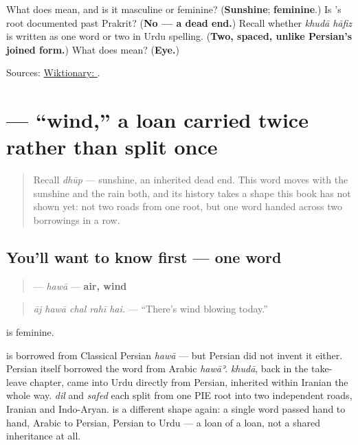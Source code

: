 \begin{tcolorbox}[breakable,colback=teal!4,colframe=teal!35!black,title={Before you move on}]
What does \textbf{} mean, and is it masculine or feminine? (\textbf{Sunshine}; \textbf{feminine}.) Is \textbf{}'s root documented past Prakrit? (\textbf{No — a dead end.}) Recall whether \emph{khudā hāfiz} is written as one word or two in Urdu spelling. (\textbf{Two, spaced, unlike Persian's joined form.}) What does \textbf{} mean? (\textbf{Eye.})

Sources: \href{https://en.wiktionary.org/wiki/\%D8\%AF\%DA\%BE\%D9\%88\%D9\%BE}{Wiktionary: }.
\end{tcolorbox}
\section[\texorpdfstring{\ur{ہوا} (hawā)}{ہوا (hawā)}]{ — \textquotedblleft{}wind,\textquotedblright{} a loan carried twice rather than split once}

\label{lesson:UR-C15-hawa}



\begin{quote}
Recall \emph{dhūp} — sunshine, an inherited dead end. This word moves with the sunshine and the rain both, and its history takes a shape this book has not shown yet: not two roads from one root, but one word handed across two borrowings in a row.
\end{quote}

\subsection*{You'll want to know first — one word}
\begin{quote}
\textbf{} — \emph{hawā} — \textbf{air, wind}
\end{quote}

\begin{quote}
\emph{āj hawā chal rahī hai.} — \textquotedblleft{}There's wind blowing today.\textquotedblright{}
\end{quote}

\textbf{} is feminine.

\begin{cousinweb}
\textbf{} is borrowed from Classical Persian \emph{hawā} — but Persian did not invent it either. Persian itself borrowed the word from Arabic \emph{hawāʾ}. \emph{khudā}, back in the take-leave chapter, came into Urdu directly from Persian, inherited within Iranian the whole way. \emph{dil} and \emph{safed} each split from one PIE root into two independent roads, Iranian and Indo-Aryan. \textbf{} is a different shape again: a single word passed hand to hand, Arabic to Persian, Persian to Urdu — a loan of a loan, not a shared inheritance at all.
\end{cousinweb}

